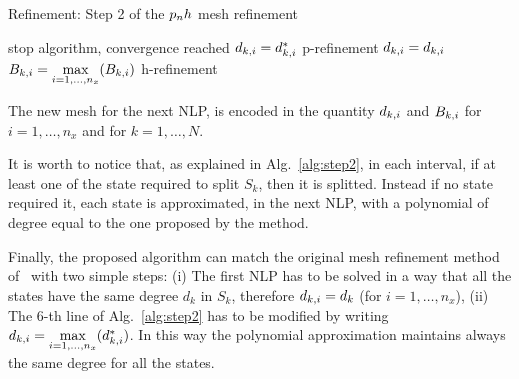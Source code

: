 \begin{algorithm}
	\caption{Refinement: Step 2 of the $p_{n}h$ mesh refinement}\label{alg:step2}
	\begin{algorithmic}[1]
			\If {$\Dks = \Dk$}
				\State stop algorithm, convergence reached	
			\Else
					\State $d_{k,i} = d_{k,i}^{*}$ \Comment p-refinement
				\EndFor
			\EndIf
		\Else
				\State $d_{k,i} = d_{k,i}$
				\State $B_{k,i} = \max\limits_{i= 1, \dots, n_x}(B_{k,i})$ \Comment h-refinement
			\EndFor		
		\EndIf
	\end{algorithmic}
\end{algorithm}


The new mesh for the next NLP, is encoded in the quantity $d_{k,i}$ and $B_{k,i}$ for $i = 1, \dots, n_x$ and for $k = 1, \dots, N$.

It is worth to notice that, as explained in Alg.~\ref{alg:step2}, in each interval, if at least one of the state required to split $S_k$, then it is splitted. Instead if no state required it, each state is approximated, in the next NLP, with a polynomial of degree equal to the one proposed by the method.

Finally, the proposed algorithm can match the original mesh refinement method of~\cite{Patterson:OCAM:2015} with two simple steps: (i) The first NLP has to be solved in a way that all the states have the same degree $d_k$ in $S_k$, therefore $d_{k,i} = d_k$ (for $i = 1, \dots, n_x$), (ii) The $6$-th line of Alg.~\ref{alg:step2} has to be modified by writing $d_{k,i} = \max\limits_{i= 1, \dots, n_x}(d_{k,i}^{*})$. In this way the polynomial approximation maintains always the same degree for all the states.



